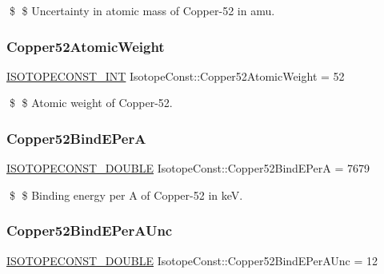 \$ \$ Uncertainty in atomic mass of Copper-\/52 in amu. \mbox{\label{group___isotope_const-_copper-_cu52_ga37f7d0a0b41999b04b9e6c8d8efa5dac}} 
\subsubsection{\texorpdfstring{Copper52\+Atomic\+Weight}{Copper52AtomicWeight}}
{\footnotesize\ttfamily \mbox{\hyperlink{group___isotope_const-_macros_ga5f18360b3e99483a35c32d789e62621c}{I\+S\+O\+T\+O\+P\+E\+C\+O\+N\+S\+T\+\_\+\+I\+NT}} Isotope\+Const\+::\+Copper52\+Atomic\+Weight = 52}

\$ \$ Atomic weight of Copper-\/52. \mbox{\label{group___isotope_const-_copper-_cu52_ga71827804c88e8c42938a47ec559dbb31}} 
\subsubsection{\texorpdfstring{Copper52\+Bind\+E\+PerA}{Copper52BindEPerA}}
{\footnotesize\ttfamily \mbox{\hyperlink{group___isotope_const-_macros_ga8f45a7272ce02c0b4c65c44636ed719a}{I\+S\+O\+T\+O\+P\+E\+C\+O\+N\+S\+T\+\_\+\+D\+O\+U\+B\+LE}} Isotope\+Const\+::\+Copper52\+Bind\+E\+PerA = 7679}

\$ \$ Binding energy per A of Copper-\/52 in keV. \mbox{\label{group___isotope_const-_copper-_cu52_gaece54db44f3e9ffcb489217ef6771acd}} 
\subsubsection{\texorpdfstring{Copper52\+Bind\+E\+Per\+A\+Unc}{Copper52BindEPerAUnc}}
{\footnotesize\ttfamily \mbox{\hyperlink{group___isotope_const-_macros_ga8f45a7272ce02c0b4c65c44636ed719a}{I\+S\+O\+T\+O\+P\+E\+C\+O\+N\+S\+T\+\_\+\+D\+O\+U\+B\+LE}} Isotope\+Const\+::\+Copper52\+Bind\+E\+Per\+A\+Unc = 12}

